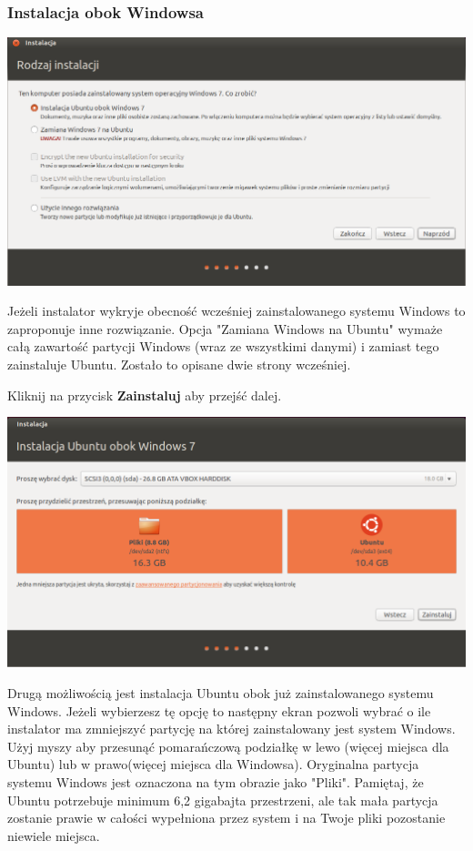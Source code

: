 \subsubsection{Instalacja obok Windowsa}
\begin{center}
        \includegraphics[scale=0.5]{images/instalator_partycjonowanie_obok_wondows7.png}
\end{center}
Jeżeli instalator wykryje obecność wcześniej zainstalowanego systemu Windows to zaproponuje inne rozwiązanie. Opcja "Zamiana Windows na Ubuntu" wymaże całą zawartość partycji Windows (wraz ze wszystkimi danymi) i zamiast tego zainstaluje Ubuntu. Zostało to opisane dwie strony wcześniej.
\begin{flushright}
Kliknij na przycisk \textbf{Zainstaluj} aby przejść dalej.
\end{flushright}
\clearpage
\begin{center}
        \includegraphics[scale=0.5]{images/instalator_partycjonowanie_obok_wondows7_2.png}
\end{center}
Drugą możliwością jest instalacja Ubuntu obok już zainstalowanego systemu Windows. Jeżeli wybierzesz tę opcję to następny ekran pozwoli wybrać o ile instalator ma zmniejszyć partycję na której zainstalowany jest system Windows. Użyj myszy aby przesunąć pomarańczową podziałkę w lewo (więcej miejsca dla Ubuntu) lub w prawo(więcej miejsca dla Windowsa). Oryginalna partycja systemu Windows jest oznaczona na tym obrazie jako "Pliki". Pamiętaj, że Ubuntu potrzebuje minimum 6,2 gigabajta przestrzeni, ale tak mała partycja zostanie prawie w całości wypełniona przez system i na Twoje pliki pozostanie niewiele miejsca.

